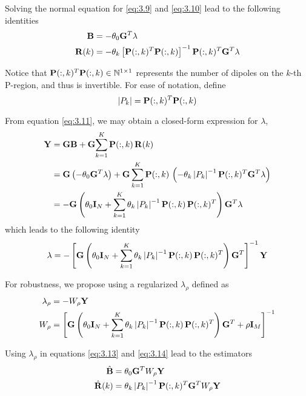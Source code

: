 Solving the normal equation for \eqref{eq:3.9} and \eqref{eq:3.10} lead to the following identities
\begin{align}
    \mathbf{B} &= -\theta_0 \mathbf{G}^T \lambda
    \label{eq:3.13}
    \\
    \mathbf{R}(k)
    &=
    -\theta_k \left[ \mathbf{P}(:,k)^T \mathbf{P}(:,k) \right]^{-1} \mathbf{P}(:,k)^T \mathbf{G}^T \lambda 
    \label{eq:3.14}
\end{align}

Notice that $\mathbf{P}(:,k)^T \mathbf{P}(:,k) \in \mathbb{N}^{1\times 1}$ represents the number of dipoles on the $k$-th P-region, and thus is invertible.
%
For ease of notation, define
\begin{equation}
    \left| {P_k} \right| = \mathbf{P}(:,k)^T \mathbf{P}(:,k)
\end{equation}

From equation \eqref{eq:3.11}, we may obtain a closed-form expression for $\lambda$,
\begin{align}
    \mathbf{Y}
    &=
    \mathbf{G} \mathbf{B} + \mathbf{G} { \sum_{k=1}^K { \mathbf{P}(:,k)\, \mathbf{R}(k) } }
    \nonumber \\
    &=
    \mathbf{G}\left( -\theta_0 \mathbf{G}^T \lambda \right)
    + \mathbf{G} \sum_{k=1}^K
    { \mathbf{P}(:,k)\, \left( -\theta_k \left| {P_k} \right|^{-1} \mathbf{P}(:,k)^T \mathbf{G}^T \lambda \right)}
    \nonumber \\
    &=
    -\mathbf{G} \left(  \theta_0 \mathbf{I}_N + \sum_{k=1}^K \theta_k \left| {P_k} \right|^{-1} 
    \mathbf{P}(:,k)\, \mathbf{P}(:,k)^T
     \right) \mathbf{G}^T \lambda
\end{align}
which leads to the following identity
\begin{equation}
    \lambda
    =
    -\left[ \mathbf{G} \left(  \theta_0 \mathbf{I}_N + \sum_{k=1}^K \theta_k \left| {P_k} \right|^{-1} 
    \mathbf{P}(:,k)\, \mathbf{P}(:,k)^T
     \right) \mathbf{G}^T \right]^{-1} \mathbf{Y}
\end{equation}

For robustness, we propose using a regularized $\lambda_\rho$ defined as
\begin{align}
    \lambda_\rho &= -W_\rho  \mathbf{Y} 
    \\
    W_\rho &=
    \left[ \mathbf{G} \left(  \theta_0 \mathbf{I}_N + \sum_{k=1}^K \theta_k \left| {P_k} \right|^{-1} 
    \mathbf{P}(:,k)\, \mathbf{P}(:,k)^T
     \right) \mathbf{G}^T + \rho \mathbf{I}_M  \right]^{-1}
\end{align}

Using $\lambda_\rho$ in equations \eqref{eq:3.13} and \eqref{eq:3.14} lead to the estimators
\begin{align}
    \hat{\mathbf{B}} &=
    \theta_0 \mathbf{G}^T W_\rho \mathbf{Y}
    \\
    \hat{\mathbf{R}}(k) &=
    \theta_k \left| {P_k} \right|^{-1} \mathbf{P}(:,k)^T \mathbf{G}^T W_\rho \mathbf{Y}
\end{align}


